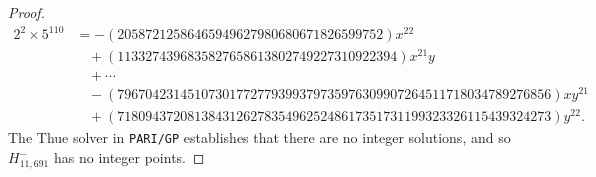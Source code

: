\documentclass[12pt]{amsart}
\newcommand{\?}{\color{red}?}
\numberwithin{equation}{section}
\begin{document}
\begin{proof}
\small 
\begin{displaymath}
\begin{split}
2^2\times5^{110}&=
-(20587212586465949627980680671826599752) x^{22} \\
&\ \  \ \   + (1133274396835827658613802749227310922394) x^{21} y\\ 
&\ \ \ \ +\cdots\\
 &\ \ \ \  -(79670423145107301772779399379735976309907264511718034789276856) x y^{21}\\
&\ \ \ \  +(71809437208138431262783549625248617351731199323326115439324273)y^{22}.
 \end{split}
 \end{displaymath}
\normalsize
The Thue solver in \texttt{PARI/GP} establishes that there are no integer solutions, and so $H^{-}_{11,691}$ has no integer points.
\end{proof}
\end{document}
